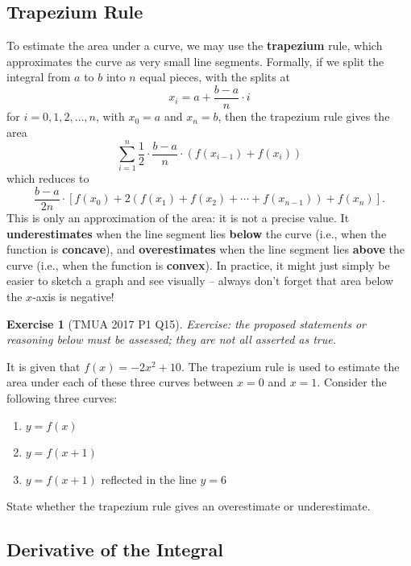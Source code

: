 \documentclass[11pt]{article}
\theoremstyle{definition}
\newtheorem{example}[theorem]{Exercise}
\theoremstyle{remark}
\newcommand{\pqty}[1]{\left(#1\right)}
\newcommand{\bqty}[1]{\left[#1\right]}
\begin{document}
\subsection{Trapezium Rule}\label{tmua-4-subsection-011}

To estimate the area under a curve, we may use the \textbf{trapezium} rule, which approximates the curve as very small line segments. Formally, if we split the integral from \(a\) to \(b\) into \(n\) equal pieces, with the splits at
\[
    x_i = a + \frac{b - a}{n} \cdot i
\]
for \(i = 0, 1, 2, \ldots, n\), with \(x_0 = a\) and \(x_n = b\), then the trapezium rule gives the area
\[
    \sum_{i = 1}^{n} \frac{1}{2} \cdot \frac{b - a}{n} \cdot \pqty{f\pqty{x_{i - 1}} + f\pqty{x_i}}
\]
which reduces to
\[
    \frac{b - a}{2n} \cdot \bqty{f\pqty{x_0} + 2\pqty{f\pqty{x_1} + f\pqty{x_2} + \cdots + f\pqty{x_{n - 1}}} + f\pqty{x_n}}.
\]
This is only an approximation of the area: it is not a precise value. It \textbf{underestimates} when the line segment lies \textbf{below} the curve (i.e., when the function is \textbf{concave}), and \textbf{overestimates} when the line segment lies \textbf{above} the curve (i.e., when the function is \textbf{convex}). In practice, it might just simply be easier to sketch a graph and see visually -- always don't forget that area below the \(x\)-axis is negative!

\begin{example}[TMUA 2017 P1 Q15]\label{tmua-4-unit-030}
\textit{Exercise: the proposed statements or reasoning below must be assessed; they are not all asserted as true.}\par

    It is given that \(f\pqty{x} = - 2x^2 + 10\). The trapezium rule is used to estimate the area under each of these three curves between \(x = 0\) and \(x = 1\). Consider the following three curves:
    \begin{enumerate}[label=\Roman*.]
        \item \(y = f\pqty{x}\)
        \item \(y = f\pqty{x + 1}\)
        \item \(y = f\pqty{x + 1}\) reflected in the line \(y = 6\)
    \end{enumerate}

    State whether the trapezium rule gives an overestimate or underestimate.
\end{example}

\subsection{Derivative of the Integral}\label{tmua-4-subsection-012}
\end{document}

